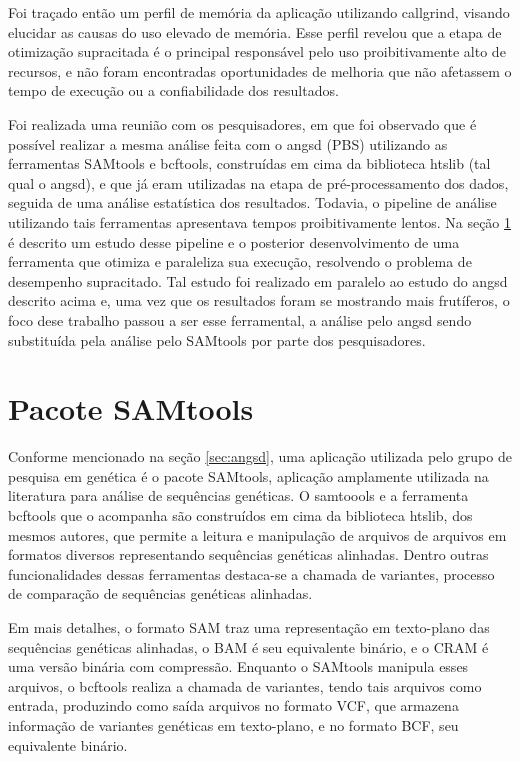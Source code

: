 \documentclass[cic,tc]{iiufrgs}
\begin{document}
Foi traçado então um perfil de memória da aplicação utilizando callgrind,
visando elucidar as causas do uso elevado de memória. Esse perfil revelou que a
etapa de otimização supracitada é o principal responsável pelo uso
proibitivamente alto de recursos, e não foram encontradas oportunidades de
melhoria que não afetassem o tempo de execução ou a confiabilidade dos
resultados.

Foi realizada uma reunião com os pesquisadores, em que foi observado que é
possível realizar a mesma análise feita com o angsd (PBS) utilizando as
ferramentas SAMtools e bcftools, construídas em cima da biblioteca htslib (tal
qual o angsd), e que já eram utilizadas na etapa de pré-processamento dos
dados, seguida de uma análise estatística dos resultados. Todavia, o pipeline
de análise utilizando tais ferramentas apresentava tempos proibitivamente
lentos. Na seção \ref{sec:SAMtools} é descrito um estudo desse pipeline e o
posterior desenvolvimento de uma ferramenta que otimiza e paraleliza sua
execução, resolvendo o problema de desempenho supracitado. Tal estudo foi
realizado em paralelo ao estudo do angsd descrito acima e, uma vez que os
resultados foram se mostrando mais frutíferos, o foco dese trabalho passou a
ser esse ferramental, a análise pelo angsd sendo substituída pela análise pelo
SAMtools por parte dos pesquisadores.

\chapter{Pacote SAMtools}
\label{sec:SAMtools}

Conforme mencionado na seção \ref{sec:angsd}, uma aplicação utilizada pelo
grupo de pesquisa em genética é o pacote SAMtools,\cite{li2009sequence}
aplicação amplamente utilizada na literatura para análise de sequências
genéticas.\cite{danecek2021twelve} O samtoools e a ferramenta bcftools que o
acompanha são construídos em cima da biblioteca htslib, dos mesmos autores, que
permite a leitura e manipulação de arquivos de arquivos em formatos diversos
representando sequências genéticas alinhadas. Dentro outras funcionalidades
dessas ferramentas destaca-se a chamada de variantes, processo de comparação de
sequências genéticas alinhadas.\cite{danecek2021twelve}

Em mais detalhes, o formato SAM traz uma representação em texto-plano das
sequências genéticas alinhadas, o BAM é seu equivalente binário, e o CRAM é uma
versão binária com compressão. Enquanto o SAMtools manipula esses arquivos, o
bcftools realiza a chamada de variantes, tendo tais arquivos como entrada,
produzindo como saída arquivos no formato VCF, que armazena informação de
variantes genéticas em texto-plano, e no formato BCF, seu equivalente
binário.\cite{danecek2021twelve}
\end{document}
